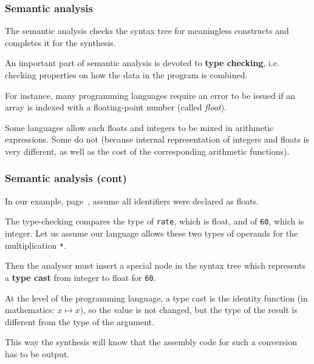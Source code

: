 % 
\begin{frame}
\frametitle{Semantic analysis}

The semantic analysis checks the syntax tree for meaningless
constructs and completes it for the synthesis.

\bigskip

An important part of semantic analysis is devoted to
\textbf{type checking}, i.e. checking properties on how the data in
the program is combined.

\bigskip

For instance, many programming languages require an error to be
issued if an array is indexed with a floating-point number (called
\emph{float}).

\bigskip

Some languages allow such floats and integers to be mixed in
arithmetic expressions. Some do not (because internal representation
of integers and floats is very different, as well as the cost of the
corresponding arithmetic functions).

\end{frame}

% 
\begin{frame}[containsverbatim]
\frametitle{Semantic analysis (cont)}

In our example, page~\pageref{ast_eg}, assume all identifiers were
declared as floats. 

\bigskip

The type-checking compares the type of \texttt{rate}, which is float,
and of \texttt{60}, which is integer. Let us assume our language
allows these two types of operands for the multiplication \verb|*|.

\bigskip

Then the analyser must insert a special node in the syntax tree which
represents a \textbf{type cast} from integer to float for
\texttt{60}. 

\bigskip

At the level of the programming language, a type cast is the identity
function (in mathematics: \(x \mapsto x\)), so the value is not
changed, but the type of the result is different from the type of the
argument.

\bigskip

This way the synthesis will know that the assembly code for such a
conversion has to be output.

\end{frame}

